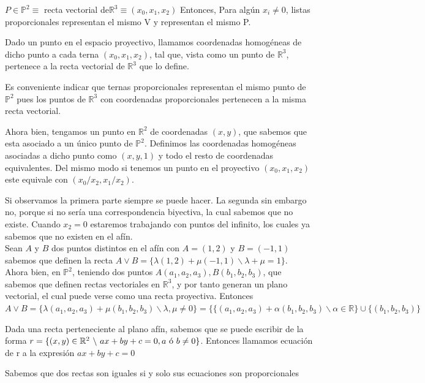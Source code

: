 	$P \in \mathbb{P}^2 \equiv$ recta vectorial de$ \mathbb{R}^3 \equiv (x_0,x_1,x_2) $
	Entonces, Para algún $x_i \ne 0$, listas proporcionales representan el mismo V y representan el mismo P.

\begin{ndef}
Dado un punto en el espacio proyectivo, llamamos coordenadas homogéneas de dicho punto a cada terna $(x_0,x_1,x_2)$, tal que, vista como un punto de $\mathbb{R}^3$, pertenece a la recta vectorial de $\mathbb{R}^3$ que lo define.
\end{ndef}

Es conveniente indicar que ternas proporcionales representan el mismo punto de $\mathbb{P}^2$ pues los puntos de $\mathbb{R}^3$ con coordenadas proporcionales pertenecen a la misma recta vectorial.

Ahora bien, tengamos un punto en $\mathbb{R}^2$ de coordenadas $(x,y)$, que sabemos que esta asociado a un único punto de $\mathbb{P}^2$. Definimos las coordenadas homogéneas asociadas a dicho punto como $(x,y,1)$ y todo el resto de coordenadas equivalentes. Del mismo modo si tenemos un punto en el proyectivo  $(x_0, x_1, x_2)$ este equivale con $(x_0/x_2, x_1/x_2)$.

Si observamos la primera parte siempre se puede hacer. La segunda sin embargo no, porque si no sería una correspondencia biyectiva, la cual sabemos que no existe. Cuando $x_2 = 0$ estaremos trabajando con puntos del infinito, los cuales ya sabemos que no existen en el afín.\\

Sean $A$ y $B$ dos puntos distintos en el afín con $A =(1,2)$ y $B=(-1,1)$ sabemos que definen la recta $A \vee B = \{ \lambda (1,2) + \mu (-1,1) \backslash \lambda + \mu = 1\}$.\\
Ahora bien, en $\mathbb{P}^2$, teniendo dos puntos $A(a_1,a_2,a_3), B(b_1,b_2,b_3)$, que sabemos que definen rectas vectoriales en $\mathbb{R}^3$, y por tanto generan un plano vectorial, el cual puede verse como una recta proyectiva. Entonces $A\vee B = \{ \lambda (a_1,a_2,a_3) + \mu (b_1,b_2,b_3)\backslash \lambda, \mu \ne 0 \} = \{  \{ (a_1,a_2,a_3) + \alpha (b_1,b_2,b_3)\backslash \alpha  \in \mathbb{R}\} \cup  \{(b_1,b_2,b_3) \}$

\begin{ndef}
Dada una recta perteneciente al plano afín, sabemos que se puede escribir de la forma $r = \{(x,y) \in \mathbb{R}^2\ \backslash\ ax + by + c = 0, a \textup{ ó } b \neq 0\}$. Entonces llamamos ecuación de r a la expresión $ax + by + c = 0$
\end{ndef}
Sabemos que dos rectas son iguales si y solo sus ecuaciones son proporcionales

